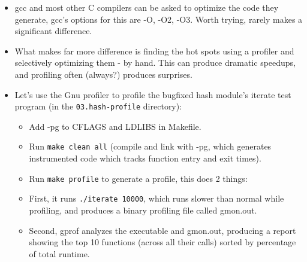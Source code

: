 \documentclass[handout]{beamer}
\newcommand{\pitem}{\pause \item}
\begin{document}
\begin{frame}[fragile]
    \begin{itemize}
    \item
      \alert{gcc} and most other C compilers can be asked to
      \alert{optimize the code they generate}, gcc's options for this
      are \alert{-O, -O2, -O3}.
      Worth trying, rarely makes a significant difference.
    \pause
    \item
      What makes far more difference is finding the \alert{hot spots}
      using a \alert{profiler} and selectively optimizing them - by hand.
      This can produce dramatic speedups, and profiling often (always?)
      produces surprises.
    \pause
    \item
      Let's use the \alert{Gnu profiler} to profile the bugfixed hash
      module's \alert{iterate} test program
      (in the \verb+03.hash-profile+ directory):
      \begin{itemize}
      \item
        Add -pg to CFLAGS and LDLIBS in Makefile.
      \item
	Run \verb+make clean all+
	(compile and link with \alert{-pg}, which generates instrumented
        code which tracks function entry and exit times).
      \item
	Run \verb+make profile+ to generate a profile, this does 2 things:
      \pitem
	First, it runs \verb+./iterate 10000+, which runs slower than normal
  	while profiling, and produces a binary profiling file
	called \alert{gmon.out}.
      \item
        Second, \alert{gprof} analyzes the executable and \alert{gmon.out},
        producing a report showing the top 10 functions
        (across all their calls) sorted by percentage of total runtime.
      \end{itemize}
    \end{itemize}
\end{frame}
\end{document}
